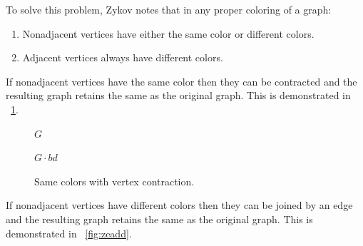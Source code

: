 To solve this problem, Zykov notes that in any proper coloring of a graph:
\begin{enumerate}
\item Nonadjacent vertices have either the same color or different colors.
\item Adjacent vertices always have different colors.
\end{enumerate}
If nonadjacent vertices have the same color then they can be contracted and the resulting graph retains the same
 as the original graph.  This is demonstrated in \figurename~\ref{fig:zvcon}.

\begin{figure}[H]
  \begin{minipage}{2.5in}
    \centering

    \(G\)
  \end{minipage}
  \begin{minipage}{2.5in}
    \centering

    \(G\cdot bd\)
  \end{minipage}
  \caption{Same colors with vertex contraction.}
  \label{fig:zvcon}
\end{figure}

If nonadjacent vertices have different colors then they can be joined by an edge and the resulting graph retains
the same  as the original graph.  This is demonstrated in \figurename~\ref{fig:zeadd}.

